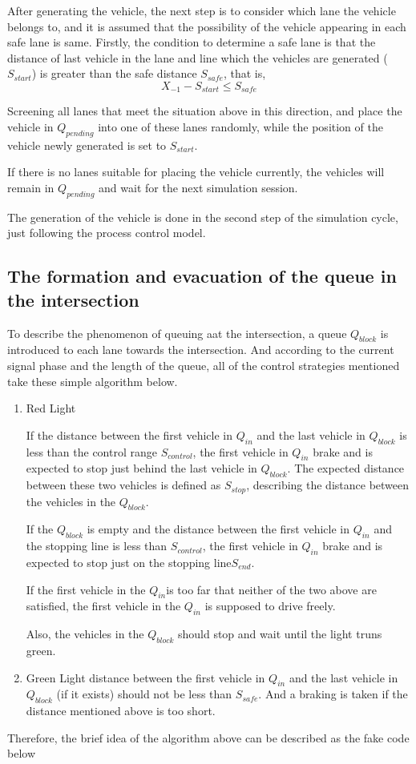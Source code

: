 \documentclass[a4paper]{paper}
\begin{document}
After generating the vehicle, the next step is to consider which lane the vehicle belongs to, and it is assumed that the possibility of the vehicle appearing in each safe lane is same. Firstly, the condition to determine a safe lane is that the distance of last vehicle in the lane and line which the vehicles are generated ($S_{start}$) is greater than the safe distance $S_{safe}$, that is,
$$X_{-1}-S_{start}\le S_{safe}$$

Screening all lanes that meet the situation above in this direction, and place the vehicle in $Q_{pending}$ into one of these lanes randomly, while the position of the vehicle newly generated is set to $S_{start}$.

If there is no lanes suitable for placing the vehicle currently, the vehicles will remain in $Q_{pending}$ and wait for the next simulation session.

The generation of the vehicle is done in the second step of the simulation cycle, just following the process control model.
\subsection{The formation and evacuation of the queue in the intersection}
\label{section:feq}
To describe the phenomenon of queuing aat the intersection, a queue $Q_{block}$ is introduced to each lane towards the intersection. And according to the current signal phase and the length of the queue, all of the control strategies mentioned take these simple algorithm below.
\begin{enumerate}
\item Red Light

If the distance between the first vehicle in $Q_{in}$ and the last vehicle in $Q_{block}$ is less than the control range $S_{control}$, the first vehicle in $Q_{in}$ brake and is expected to stop just behind the last vehicle in $Q_{block}$. The expected distance between these two vehicles is defined as $S_{stop}$, describing the distance between the vehicles in the $Q_{block}$. 

If the $Q_{block}$ is empty and the distance between the first vehicle in $Q_{in}$ and the stopping line is less than $S_{control}$, the first vehicle in $Q_{in}$ brake and is expected to stop just on the stopping line$S_{end}$.

If the first vehicle in the $Q_{in}$is too far that neither of the two above are satisfied, the first vehicle in the $Q_{in}$ is supposed to drive freely.

Also, the vehicles in the $Q_{block}$ should stop and wait until the light truns green.
\item Green Light
distance between the first vehicle in $Q_{in}$ and the last vehicle in $Q_{block}$ (if it exists) should not be less than $S_{safe}$. And a braking is taken if the distance mentioned above is too short.
\end{enumerate}
Therefore, the brief idea of the algorithm above can be described as the fake code below\\ 
\end{document}
